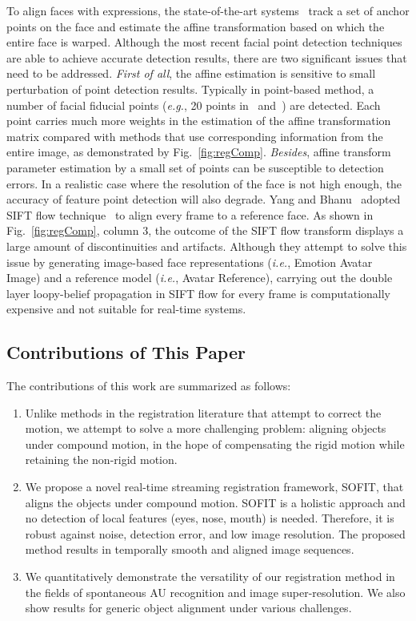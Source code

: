 \documentclass[10pt,journal]{IEEEtran}
\begin{document}
To align faces with expressions, the state-of-the-art systems~\cite{Valstar_SMCB12,Littlewort_CERT_FG2011,Tadas_FERA15} track a set of anchor points on the face and estimate the affine transformation based on which the entire face is warped. Although the most recent facial point detection techniques~\cite{Martinez_PAMI13,Xiong13,Zhu_CVPR12,Tadas_ECCV14} are able to achieve accurate detection results, there are two significant issues that need to be addressed. \textit{First of all}, the affine estimation is sensitive to small perturbation of point detection results. Typically in point-based method, a number of facial fiducial points (\textit{e.g.}, 20 points in~\cite{Valstar_SMCB12} and~\cite{Martinez_PAMI13}) are detected. Each point carries much more weights in the estimation of the affine transformation matrix compared with methods that use corresponding information from the entire image, as demonstrated by Fig.~\ref{fig:regComp}. \textit{Besides}, affine transform parameter estimation by a small set of points can be susceptible to detection errors. In a realistic case where the resolution of the face is not high enough, the accuracy of feature point detection will also degrade. Yang and Bhanu~\cite{Yang_SMCB12} adopted SIFT flow technique~\cite{Liu_PAMI11} to align every frame to a reference face. As shown in Fig.~\ref{fig:regComp}, column 3, the outcome of the SIFT flow transform displays a large amount of discontinuities and artifacts. Although they attempt to solve this issue by generating image-based face representations (\textit{i.e.}, Emotion Avatar Image) and a reference model (\textit{i.e.}, Avatar Reference), carrying out the double layer loopy-belief propagation in SIFT flow for every frame is computationally expensive and not suitable for real-time systems.

\subsection{\label{sec:contribution}Contributions of This Paper}

The contributions of this work are summarized as follows:

\begin{enumerate}
\item Unlike methods in the registration literature that attempt to correct the motion, we attempt to solve a more challenging problem: aligning objects under compound motion, in the hope of compensating the rigid motion while retaining the non-rigid motion.
\item We propose a novel real-time streaming registration framework, SOFIT, that aligns the objects under compound motion. SOFIT is a holistic approach and no detection of local features (eyes, nose, mouth) is needed. Therefore, it is robust against noise, detection error, and low image resolution. The proposed method results in temporally smooth and aligned image sequences.
\item We quantitatively demonstrate the versatility of our registration method in the fields of spontaneous AU recognition and image super-resolution. We also show results for generic object alignment under various challenges.
\end{enumerate}
\end{document}
